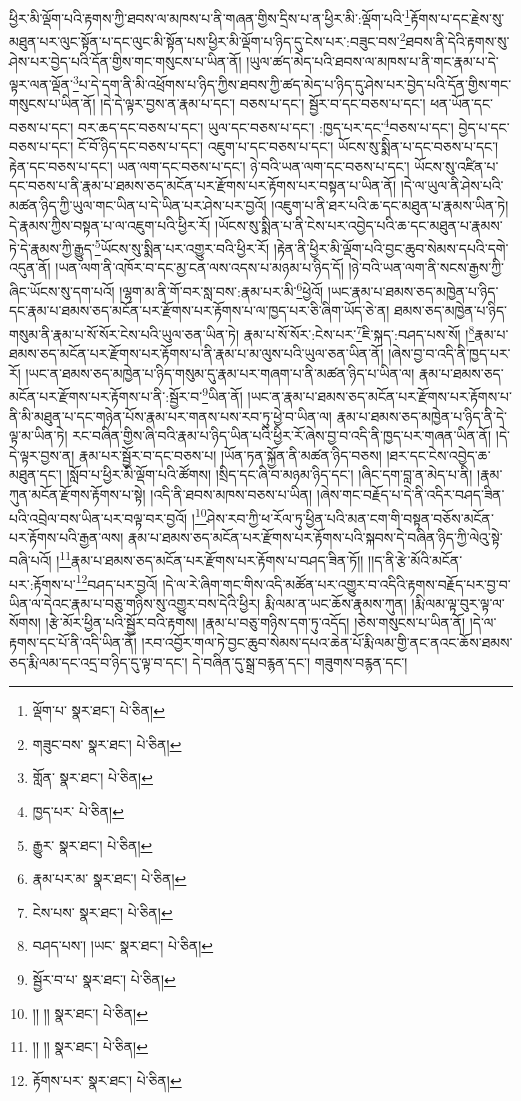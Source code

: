 ཕྱིར་མི་ལྡོག་པའི་རྟགས་ཀྱི་ཐབས་ལ་མཁས་པ་ནི་གཞན་གྱིས་དྲིས་པ་ན་ཕྱིར་མི་:ལྡོག་པའི་\footnote{ལྡོག་པ་  སྣར་ཐང་།  པེ་ཅིན། }རྟོགས་པ་དང་རྗེས་སུ་མཐུན་པར་ལུང་སྟོན་པ་དང་ལུང་མི་སྟོན་པས་ཕྱིར་མི་ལྡོག་པ་ཉིད་དུ་ངེས་པར་:བཟུང་བས་\footnote{གཟུང་བས་  སྣར་ཐང་།  པེ་ཅིན། }ཐབས་ནི་དེའི་རྟགས་སུ་ཤེས་པར་བྱེད་པའི་དོན་གྱིས་གང་གསུངས་པ་ཡིན་ནོ། །ཡུལ་ཚད་མེད་པའི་ཐབས་ལ་མཁས་པ་ནི་གང་རྣམ་པ་དེ་ལྟར་ལན་ལྡོན་\footnote{གློན་  སྣར་ཐང་།  པེ་ཅིན། }པ་དེ་དག་ནི་མི་འཕྲོགས་པ་ཉིད་ཀྱིས་ཐབས་ཀྱི་ཚད་མེད་པ་ཉིད་དུ་ཤེས་པར་བྱེད་པའི་དོན་གྱིས་གང་གསུངས་པ་ཡིན་ནོ། །དེ་དེ་ལྟར་བྱས་ན་རྣམ་པ་དང་། བཅས་པ་དང་། སྦྱོར་བ་དང་བཅས་པ་དང་། ཕན་ཡོན་དང་བཅས་པ་དང་། བར་ཆད་དང་བཅས་པ་དང་། ཡུལ་དང་བཅས་པ་དང་། :ཁྱད་པར་དང་\footnote{ཁྱད་པར་  པེ་ཅིན། }བཅས་པ་དང་། བྱེད་པ་དང་བཅས་པ་དང་། ངོ་བོ་ཉིད་དང་བཅས་པ་དང་། འཇུག་པ་དང་བཅས་པ་དང་། ཡོངས་སུ་སྨིན་པ་དང་བཅས་པ་དང་། རྟེན་དང་བཅས་པ་དང་། ཡན་ལག་དང་བཅས་པ་དང་། ཉེ་བའི་ཡན་ལག་དང་བཅས་པ་དང་། ཡོངས་སུ་འཛིན་པ་དང་བཅས་པ་ནི་རྣམ་པ་ཐམས་ཅད་མངོན་པར་རྫོགས་པར་རྟོགས་པར་བསྟན་པ་ཡིན་ནོ། །དེ་ལ་ཡུལ་ནི་ཤེས་པའི་མཚན་ཉིད་ཀྱི་ཡུལ་གང་ཡིན་པ་དེ་ཡིན་པར་ཤེས་པར་བྱའོ། །འཇུག་པ་ནི་ཐར་པའི་ཆ་དང་མཐུན་པ་རྣམས་ཡིན་ཏེ། དེ་རྣམས་ཀྱིས་བསྟན་པ་ལ་འཇུག་པའི་ཕྱིར་རོ། །ཡོངས་སུ་སྨིན་པ་ནི་ངེས་པར་འབྱེད་པའི་ཆ་དང་མཐུན་པ་རྣམས་ཏེ་དེ་རྣམས་ཀྱི་རྒྱུད་\footnote{རྒྱུར་  སྣར་ཐང་།  པེ་ཅིན། }ཡོངས་སུ་སྨིན་པར་འགྱུར་བའི་ཕྱིར་རོ། །རྟེན་ནི་ཕྱིར་མི་ལྡོག་པའི་བྱང་ཆུབ་སེམས་དཔའི་དགེ་འདུན་ནོ། །ཡན་ལག་ནི་འཁོར་བ་དང་མྱ་ངན་ལས་འདས་པ་མཉམ་པ་ཉིད་དོ། །ཉེ་བའི་ཡན་ལག་ནི་སངས་རྒྱས་ཀྱི་ཞིང་ཡོངས་སུ་དག་པའོ། །ལྷག་མ་ནི་གོ་བར་སླ་བས་:རྣམ་པར་མི་\footnote{རྣམ་པར་མ་  སྣར་ཐང་།  པེ་ཅིན། }ཕྱེའོ། །ཡང་རྣམ་པ་ཐམས་ཅད་མཁྱེན་པ་ཉིད་དང་རྣམ་པ་ཐམས་ཅད་མངོན་པར་རྫོགས་པར་རྟོགས་པ་ལ་ཁྱད་པར་ཅི་ཞིག་ཡོད་ཅེ་ན། ཐམས་ཅད་མཁྱེན་པ་ཉིད་གསུམ་ནི་རྣམ་པ་སོ་སོར་ངེས་པའི་ཡུལ་ཅན་ཡིན་ཏེ། རྣམ་པ་སོ་སོར་:ངེས་པར་\footnote{ངེས་པས་  སྣར་ཐང་།  པེ་ཅིན། }ཇི་སྐད་:བཤད་པས་སོ། །\footnote{བཤད་པས་། །ཡང་  སྣར་ཐང་།  པེ་ཅིན། }རྣམ་པ་ཐམས་ཅད་མངོན་པར་རྫོགས་པར་རྟོགས་པ་ནི་རྣམ་པ་མ་ལུས་པའི་ཡུལ་ཅན་ཡིན་ནོ། །ཞེས་བྱ་བ་འདི་ནི་ཁྱད་པར་རོ། །ཡང་ན་ཐམས་ཅད་མཁྱེན་པ་ཉིད་གསུམ་དུ་རྣམ་པར་གཞག་པ་ནི་མཚན་ཉིད་པ་ཡིན་ལ། རྣམ་པ་ཐམས་ཅད་མངོན་པར་རྫོགས་པར་རྟོགས་པ་ནི་:སྦྱོར་བ་\footnote{སྦྱོར་བ་པ་  སྣར་ཐང་།  པེ་ཅིན། }ཡིན་ནོ། །ཡང་ན་རྣམ་པ་ཐམས་ཅད་མངོན་པར་རྫོགས་པར་རྟོགས་པ་ནི་མི་མཐུན་པ་དང་གཉེན་པོས་རྣམ་པར་གནས་པས་རབ་ཏུ་ཕྱེ་བ་ཡིན་ལ། རྣམ་པ་ཐམས་ཅད་མཁྱེན་པ་ཉིད་ནི་དེ་ལྟ་མ་ཡིན་ཏེ། རང་བཞིན་གྱིས་ཞི་བའི་རྣམ་པ་ཉིད་ཡིན་པའི་ཕྱིར་རོ་ཞེས་བྱ་བ་འདི་ནི་ཁྱད་པར་གཞན་ཡིན་ནོ། །དེ་དེ་ལྟར་བྱས་ན། རྣམ་པར་སྦྱོར་བ་དང་བཅས་པ། །ཡོན་ཏན་སྐྱོན་ནི་མཚན་ཉིད་བཅས། །ཐར་དང་ངེས་འབྱེད་ཆ་མཐུན་དང་། །སློབ་པ་ཕྱིར་མི་ལྡོག་པའི་ཚོགས། །སྲིད་དང་ཞི་བ་མཉམ་ཉིད་དང་། །ཞིང་དག་བླ་ན་མེད་པ་ནི། །རྣམ་ཀུན་མངོན་རྫོགས་རྟོགས་པ་སྟེ། །འདི་ནི་ཐབས་མཁས་བཅས་པ་ཡིན། །ཞེས་གང་བརྗོད་པ་དེ་ནི་འདིར་བཤད་ཟིན་པའི་འབྲེལ་བས་ཡིན་པར་བལྟ་བར་བྱའོ། །\footnote{།། །།  སྣར་ཐང་།  པེ་ཅིན། }ཤེས་རབ་ཀྱི་ཕ་རོལ་ཏུ་ཕྱིན་པའི་མན་ངག་གི་བསྟན་བཅོས་མངོན་པར་རྟོགས་པའི་རྒྱན་ལས། རྣམ་པ་ཐམས་ཅད་མངོན་པར་རྫོགས་པར་རྟོགས་པའི་སྐབས་དེ་བཞིན་ཉིད་ཀྱི་ལེའུ་སྟེ་བཞི་པའོ། །\footnote{།། །།  སྣར་ཐང་།  པེ་ཅིན། }རྣམ་པ་ཐམས་ཅད་མངོན་པར་རྫོགས་པར་རྟོགས་པ་བཤད་ཟིན་ཏོ།། །།ད་ནི་རྩེ་མོའི་མངོན་པར་:རྟོགས་པ་\footnote{རྟོགས་པར་  སྣར་ཐང་།  པེ་ཅིན། }བཤད་པར་བྱའོ། །དེ་ལ་རེ་ཞིག་གང་གིས་འདི་མཚོན་པར་འགྱུར་བ་འདིའི་རྟགས་བརྗོད་པར་བྱ་བ་ཡིན་ལ་དེའང་རྣམ་པ་བཅུ་གཉིས་སུ་འགྱུར་བས་དེའི་ཕྱིར། རྨི་ལམ་ན་ཡང་ཆོས་རྣམས་ཀུན། །རྨི་ལམ་ལྟ་བུར་ལྟ་ལ་སོགས། །རྩེ་མོར་ཕྱིན་པའི་སྦྱོར་བའི་རྟགས། །རྣམ་པ་བཅུ་གཉིས་དག་ཏུ་འདོད། །ཅེས་གསུངས་པ་ཡིན་ནོ། །དེ་ལ་རྟགས་དང་པོ་ནི་འདི་ཡིན་ནོ། །རབ་འབྱོར་གལ་ཏེ་བྱང་ཆུབ་སེམས་དཔའ་ཆེན་པོ་རྨི་ལམ་གྱི་ནང་ནའང་ཆོས་ཐམས་ཅད་རྨི་ལམ་དང་འདྲ་བ་ཉིད་དུ་ལྟ་བ་དང་། དེ་བཞིན་དུ་སྒྲ་བརྙན་དང་། གཟུགས་བརྙན་དང་། 